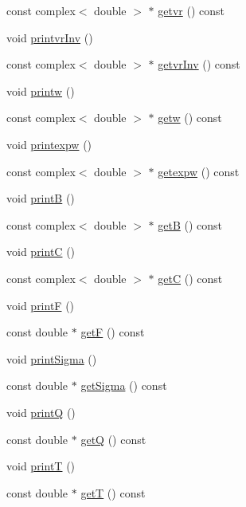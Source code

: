 \begin{DoxyCompactItemize}
const complex$<$ double $>$ $\ast$ \hyperlink{class_c_a_r_m_a_a0942ceb94c7a11df3705ad7a65b526dd}{getvr} () const 
\item 
void \hyperlink{class_c_a_r_m_a_a3145a01eae617e76e11305ca2ec4b61d}{printvr\-Inv} ()
\item 
const complex$<$ double $>$ $\ast$ \hyperlink{class_c_a_r_m_a_a05cbbdbd1978540b35f980627054caa2}{getvr\-Inv} () const 
\item 
void \hyperlink{class_c_a_r_m_a_a52ad7813fcd1aa86359bf8946fca45b4}{printw} ()
\item 
const complex$<$ double $>$ $\ast$ \hyperlink{class_c_a_r_m_a_a3e915e480eeadc65a666523b8d26064d}{getw} () const 
\item 
void \hyperlink{class_c_a_r_m_a_a8cb9254e44aa635c08059ec14a4e2248}{printexpw} ()
\item 
const complex$<$ double $>$ $\ast$ \hyperlink{class_c_a_r_m_a_a131e3f743bab72db06162b85e51bc1cf}{getexpw} () const 
\item 
void \hyperlink{class_c_a_r_m_a_ace5f4355098caa632c9aba28b2882b08}{print\-B} ()
\item 
const complex$<$ double $>$ $\ast$ \hyperlink{class_c_a_r_m_a_a0c1d34a9f872b31fdebc1fd2481ca3d1}{get\-B} () const 
\item 
void \hyperlink{class_c_a_r_m_a_a3ffc6377d85bdb5f3a4192ad5826a9df}{print\-C} ()
\item 
const complex$<$ double $>$ $\ast$ \hyperlink{class_c_a_r_m_a_af2537a7b40e800fb063943b9c469cee9}{get\-C} () const 
\item 
void \hyperlink{class_c_a_r_m_a_a003b1ea5dac58b64dba766b06991103a}{print\-F} ()
\item 
const double $\ast$ \hyperlink{class_c_a_r_m_a_a74e6e4db5aa53ee0c88d93cc92e08e6d}{get\-F} () const 
\item 
void \hyperlink{class_c_a_r_m_a_a484c74e9fbbdb718b449fd07d192ef9c}{print\-Sigma} ()
\item 
const double $\ast$ \hyperlink{class_c_a_r_m_a_ae8966239bdea7a3fc242837463d23321}{get\-Sigma} () const 
\item 
void \hyperlink{class_c_a_r_m_a_ac9b01a1959b935de28e65904529b190b}{print\-Q} ()
\item 
const double $\ast$ \hyperlink{class_c_a_r_m_a_a5ee2f32bd6e67fc81ec1088ae305dfb8}{get\-Q} () const 
\item 
void \hyperlink{class_c_a_r_m_a_a3e426d288da8c4a69995be2edb72bf8d}{print\-T} ()
\item 
const double $\ast$ \hyperlink{class_c_a_r_m_a_a2f6879444895bae5b42791d13ec9b4a1}{get\-T} () const 

\end{DoxyCompactItemize}
